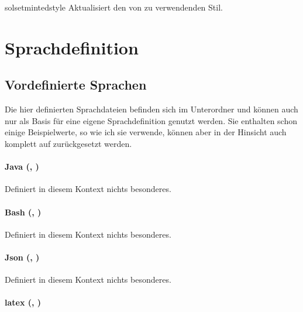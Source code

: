 \documentclass{sopra-base}
\begin{document}
\begin{command}{solsetmintedstyle}{}
    Aktualisiert den von  zu verwendenden Stil.
\end{command}

\clearpage
\appendix
\section{Sprachdefinition}

\subsection{Vordefinierte Sprachen}
\label{sec:vordefinierteSprachen}

Die hier definierten Sprachdateien befinden sich im Unterordner  und können auch nur als Basis für eine eigene Sprachdefinition genutzt werden. Sie enthalten schon einige Beispielwerte, so wie ich sie verwende, können aber in der Hinsicht auch komplett
auf  zurückgesetzt werden. 

\paragraph{Java (, )}

Definiert in diesem Kontext nichts besonderes.

\paragraph{Bash (, )}

Definiert in diesem Kontext nichts besonderes.

\paragraph{Json (, )}

Definiert in diesem Kontext nichts besonderes.

\paragraph{latex (, )}
\end{document}
